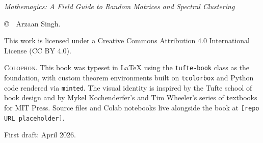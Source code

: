 
\thispagestyle{empty}
\null\vfill
\noindent
\textit{Mathemagics: A Field Guide to Random Matrices and Spectral Clustering}\par
\vspace{0.5em}
\noindent
\copyright\ \the\year\ Arzaan Singh.\par
\vspace{0.5em}
\noindent
This work is licensed under a Creative Commons Attribution 4.0 International License (CC BY 4.0).\par
\vspace{1em}
\noindent
\textsc{Colophon.} This book was typeset in \LaTeX{} using the \texttt{tufte-book} class as the foundation, with custom theorem environments built on \texttt{tcolorbox} and Python code rendered via \texttt{minted}. The visual identity is inspired by the Tufte school of book design and by Mykel Kochenderfer's and Tim Wheeler's series of textbooks for MIT Press. Source files and Colab notebooks live alongside the book at \texttt{[repo URL placeholder]}.\par
\vspace{1em}
\noindent
First draft: April 2026.\par
\clearpage
